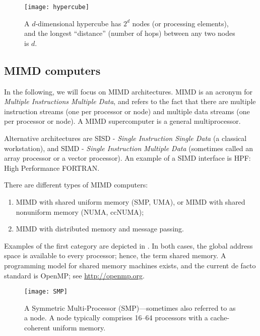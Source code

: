 \begin{figure}[htbp]
  \begin{center}
    \texttt{[image: hypercube]}
  \end{center}
  \caption{
    A $d$-dimensional hypercube has $2^d$ nodes (or processing elements), and
    the longest ``distance'' (number of hops) between any two nodes is $d$.
  }
  \label{fig:hypercube}
\end{figure}

\subsection{MIMD computers}

In the following, we will focus on MIMD architectures. MIMD is an acronym for
\emph{Multiple Instructions Multiple Data}, and refers to the fact that there
are multiple instruction streams (one per processor or node) and multiple data
streams (one per processor or node). A MIMD supercomputer is a general
multiprocessor.

Alternative architectures are SISD - \emph{Single Instruction Single Data} (a
classical workstation), and SIMD - \emph{Single Instruction Multiple Data}
(sometimes called an array processor or a vector processor). An example of a
SIMD interface is HPF: High Performance FORTRAN.

There are different types of MIMD computers:
\begin{enumerate}
\item MIMD with shared uniform memory (SMP, UMA), or MIMD with shared nonuniform
  memory (NUMA, ccNUMA);
\item MIMD with distributed memory and message passing.
\end{enumerate}

Examples of the first category are depicted in . In
both cases, the global address space is available to every processor; hence, the
term shared memory. A programming model for shared memory machines exists, and
the current de facto standard is OpenMP; see \url{http://openmp.org}.

\begin{figure}[htbp]
  \begin{center}
    \texttt{[image: SMP]}
  \end{center}
  \caption{
    A Symmetric Multi-Processor (SMP)---sometimes also referred to as a node. A
    node typically comprises 16--64 processors with a cache-coherent uniform
    memory.
  }
  \label{fig:SMP}
\end{figure}

